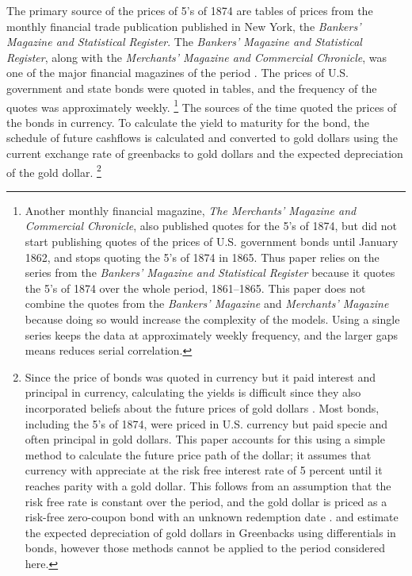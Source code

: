 The primary source of the prices of 5's of 1874 are tables of prices from the monthly financial trade publication published in New York, the \textit{Bankers' Magazine and Statistical Register}.
The \textit{Bankers' Magazine and Statistical Register}, along with the \textit{Merchants' Magazine and Commercial Chronicle}, was one of the major financial magazines of the period \parencites[186]{Mitchell1903}.
The prices of U.S. government and state bonds were quoted in tables, and the frequency of the quotes was approximately weekly.%
\footnote{
  Another monthly financial magazine, \textit{The Merchants' Magazine and Commercial Chronicle}, also published quotes for the 5's of 1874, but did not start publishing quotes of the prices of U.S. government bonds until January 1862, and stops quoting the 5's of 1874 in 1865.
  Thus paper relies on the series from the \textit{Bankers' Magazine and Statistical Register} because it quotes the 5's of 1874 over the whole period, 1861--1865.%
  This paper does not combine the quotes from the \textit{Bankers' Magazine} and \textit{Merchants' Magazine} because doing so would increase the complexity of the models. Using a single series keeps the data at approximately weekly frequency, and the larger gaps means reduces serial correlation.
}
The sources of the time quoted the prices of the bonds in currency.
To calculate the yield to maturity for the bond, the schedule of future cashflows is calculated and converted to gold dollars using the current exchange rate of greenbacks to gold dollars and the expected depreciation of the gold dollar.%
\footnote{
  Since the price of bonds was quoted in currency but it paid interest and principal in currency, calculating the yields is difficult since they also incorporated beliefs about the future prices of gold dollars \parencites[Appendix A]{Macaulay1938}{Roll1972}{Calomiris1988}[302-303]{HomerSylla2005}.
  Most bonds, including the 5's of 1874, were priced in U.S. currency but paid specie and often principal in gold dollars.
  This paper accounts for this using a simple method to calculate the future price path of the dollar; it assumes that currency with appreciate at the risk free interest rate of 5 percent until it reaches parity with a gold dollar.
  This follows from an assumption that the risk free rate is constant over the period, and the gold dollar is priced as a risk-free zero-coupon bond with an unknown redemption date \cite{McCandless1996}.
  \textcite{Roll1972} and \textcite{Calomiris1988} estimate the expected depreciation of gold dollars in Greenbacks using differentials in bonds, however those methods cannot be applied to the period considered here.
}

